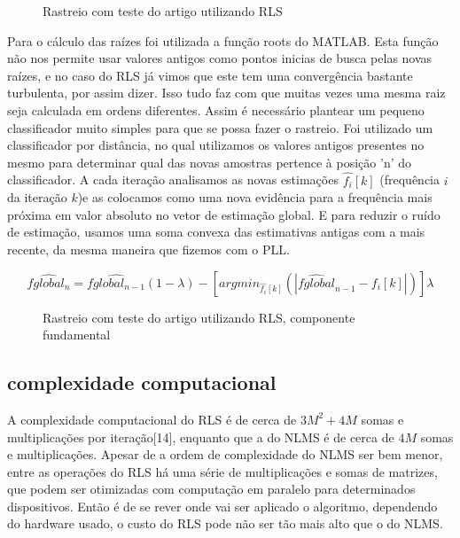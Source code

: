 \begin{figure}[H]
	\centering    
	\def\svgwidth{\columnwidth}
	
	\caption{Rastreio com teste do artigo utilizando RLS}
	\label{fig:rastreio_final}
\end{figure}


Para o cálculo das raízes foi utilizada a função roots do MATLAB. Esta função não nos permite usar valores antigos como pontos inicias de busca pelas novas raízes, e no caso do RLS já vimos que este tem uma convergência bastante turbulenta, por assim dizer. Isso tudo faz com que muitas vezes uma mesma raiz seja calculada em ordens diferentes. Assim é necessário plantear um pequeno classificador muito simples para que se possa fazer o rastreio. Foi utilizado um classificador por distância, no qual utilizamos os valores antigos presentes no mesmo para determinar qual das novas amostras pertence à posição 'n' do classificador. A cada iteração analisamos as novas estimações $\hat{f_i}[k]$ (frequência $i$ da iteração $k$)e as colocamos como uma nova evidência para a frequência mais próxima em valor absoluto no vetor de estimação global. E para reduzir o ruído de estimação, usamos uma soma convexa das estimativas antigas com a mais recente, da mesma maneira que fizemos com o PLL.

\begin{equation}
	\hat{fglobal_n}=\hat{fglobal_{n-1}}(1-\lambda)-[argmin_{\hat{f_i}[k]}(|\hat{fglobal}_{n-1}-f_i[k]|)]\lambda
\end{equation}

\begin{figure}[H]
	\centering    
	\def\svgwidth{\columnwidth}
	
	\caption{Rastreio com teste do artigo utilizando RLS, componente fundamental}
	\label{fig:rastreio_final}
\end{figure}

\subsection{complexidade computacional}

A complexidade computacional do RLS é de cerca de $3M^2 + 4M$ somas e multiplicações por iteração[14], enquanto que a do NLMS é de cerca de $4M$ somas e multiplicações. Apesar de a ordem de complexidade do NLMS ser bem menor, entre as operações do RLS há uma série de multiplicações e somas de matrizes, que podem ser otimizadas com computação em paralelo para determinados dispositivos. Então é de se rever onde vai ser aplicado o algoritmo, dependendo do hardware usado, o custo do RLS pode não ser tão mais alto que o do NLMS.

